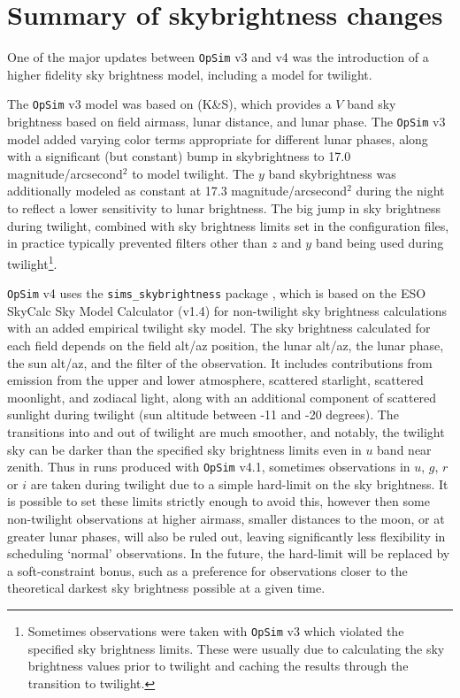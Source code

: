 \documentclass[DM,lsstdraft,authoryear,toc]{lsstdoc}
\newcommand{\opsim}{\texttt{OpSim}\xspace}
\newcommand{\simsky}{\texttt{sims\_skybrightness}\xspace}
\newcommand{\magasq}{magnitude/arcsecond$^{2}$\xspace}
\begin{document}
\section{Summary of skybrightness changes}

One of the major updates between \opsim v3 and v4 was the introduction of a higher fidelity sky brightness model, including a model for twilight. 

The \opsim v3 model was based on \citet{1991PASP..103.1033K} (K\&S), which provides a $V$ band sky brightness based on field airmass, lunar distance, and lunar phase. The \opsim v3 model added varying color terms appropriate for different lunar phases, along with a significant (but constant) bump in skybrightness to 17.0 \magasq to model twilight. The $y$ band skybrightness was additionally modeled as constant at 17.3 \magasq during the night to reflect a lower sensitivity to lunar brightness.  The big jump in sky brightness during twilight, combined with sky brightness limits set in the configuration files, in practice typically prevented filters other than $z$ and $y$ band being used during twilight\footnote{Sometimes observations were taken with \opsim v3 which violated the specified sky brightness limits. These were usually due to calculating the sky brightness values prior to twilight and caching the results through the transition to twilight.}.

\opsim v4 uses the \simsky package \citep{2016SPIE.9910E..1AY}, which is based on the ESO SkyCalc Sky Model Calculator  (v1.4) for non-twilight sky brightness calculations with an added empirical twilight sky model. The sky brightness calculated for each field depends on the field alt/az position, the lunar alt/az, the lunar phase, the sun alt/az, and the filter of the observation. It includes contributions from emission from the upper and lower atmosphere, scattered starlight, scattered moonlight, and zodiacal light, along with an additional component of scattered sunlight during twilight (sun altitude between -11 and -20 degrees). The transitions into and out of twilight are much smoother, and notably, the twilight sky can be darker than the specified sky brightness limits even in $u$ band near zenith. Thus in runs produced with \opsim v4.1, sometimes observations in $u$, $g$, $r$ or $i$ are taken during twilight due to a simple hard-limit on the sky brightness. It is possible to set these limits strictly enough to avoid this, however then some non-twilight observations at higher airmass, smaller distances to the moon, or at greater lunar phases, will also be ruled out, leaving significantly less flexibility in scheduling `normal' observations. In the future, the hard-limit will be replaced by a soft-constraint bonus, such as a preference for observations closer to the theoretical darkest sky brightness possible at a given time. 
\end{document}
